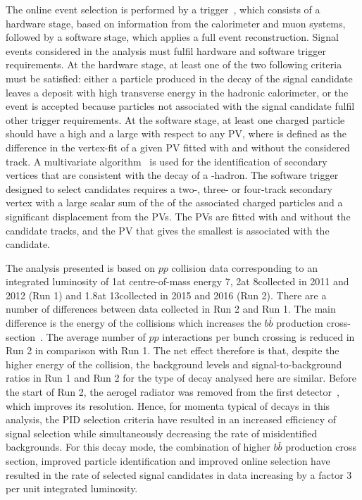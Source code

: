 The online event selection is performed by a trigger~\cite{LHCb-DP-2012-004}, which consists of a hardware stage, based on information from the calorimeter and muon systems, followed by a software stage, which applies a full event reconstruction. Signal events considered in the analysis must fulfil hardware and software trigger requirements. At the hardware stage, at least one of the two following criteria must be satisfied: either a particle produced in the decay of the signal \Bm candidate leaves a deposit with high transverse energy in the hadronic calorimeter, or the event is accepted because particles not associated with the signal candidate fulfil other trigger requirements.
At the software stage, at least one charged particle should have a high \pt and a large \chisqip with respect to any PV, where \chisqip is defined as the difference in the vertex-fit \chisq of a given PV fitted with and without the considered track. A multivariate algorithm~\cite{BBDT} is used for the identification of secondary vertices that are consistent with the decay of a \bquark-hadron.
The software trigger designed to select \decay{\Bm}{\D\Kstarm} candidates requires a two-, three- or four-track secondary vertex with a large scalar sum of the \pt of the associated charged particles and a significant displacement from the PVs.
The PVs are fitted with and without the \B candidate tracks, and the PV that gives the smallest \chisqip is associated with the \B candidate.

The analysis presented is based on $pp$ collision data corresponding to an integrated luminosity of 1\invfb at centre-of-mass energy 7\tev, 2\invfb at 8\tev collected in 2011 and 2012 (Run 1) and 1.8\invfb at 13\tev collected in 2015 and 2016 (Run 2). There are a number of differences between data collected in Run 2 and Run 1. The main difference is the energy of the collisions which increases the $b\bar{b}$ production cross-section~\cite{LHCB-PAPER-2015-037}. The average number of $pp$ interactions per bunch crossing is reduced in Run 2 in comparison with Run 1. The net effect therefore is that, despite the higher energy of the collision, the background levels and signal-to-background ratios in Run 1 and Run 2 for the type of decay analysed here are similar. Before the start of Run 2, the aerogel radiator was removed from the first \rich detector~\cite{LHCb-DP-2012-003}, which improves its resolution. Hence, for momenta typical of decays in this analysis, the PID selection criteria have resulted in an increased efficiency of signal selection while simultaneously decreasing the rate of misidentified backgrounds. For this decay mode, the combination of higher $b\bar{b}$ production cross section, improved particle identification and improved online selection have resulted in the rate of selected signal candidates in data increasing by a factor 3 per unit integrated luminosity.
